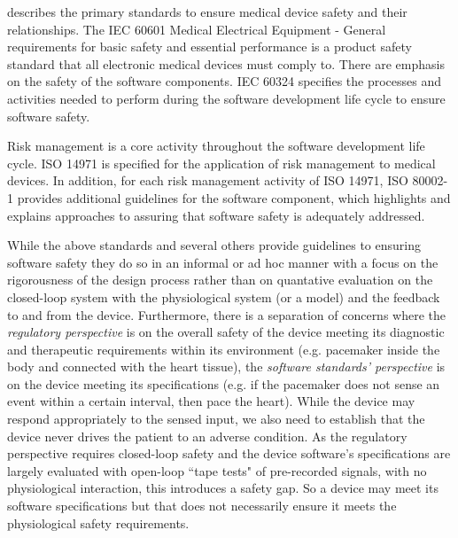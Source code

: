  describes the primary standards to ensure medical device safety and their relationships. The IEC 60601 Medical Electrical Equipment - General requirements for basic safety and essential performance is a product safety standard that all electronic medical devices must comply to. There are emphasis on the safety of the software components. IEC 60324 specifies the processes and activities needed to perform during the software development life cycle to ensure software safety. 

Risk management is a core activity throughout the software development life cycle. ISO 14971 is specified for the application of risk management to medical devices. In addition, for each risk management activity of ISO 14971, ISO 80002-1 provides additional guidelines for the software component, which highlights and explains approaches to assuring that software safety is adequately addressed.

While the above standards and several others provide guidelines to ensuring software safety they do so in an informal or ad hoc manner with a focus on the rigorousness of the design process rather than on quantative evaluation on the closed-loop system with the physiological system (or a model) and the feedback to and from the device. Furthermore, there is a separation of concerns where the \emph{regulatory perspective} is on the overall safety of the device meeting its diagnostic and therapeutic requirements within its environment (e.g. pacemaker inside the body and connected with the heart tissue), the \emph{software standards' perspective} is on the device meeting its specifications (e.g. if the pacemaker does not sense an event within a certain interval, then pace the heart). While the device may respond appropriately to the sensed input, we also need to establish that the device never drives the patient to an adverse condition. As the regulatory perspective requires closed-loop safety and the device software's specifications are largely evaluated with open-loop ``tape tests" of pre-recorded signals, with no physiological interaction, this introduces a safety gap.  So a device may meet its software specifications but that does not necessarily ensure it meets the physiological safety requirements. 

